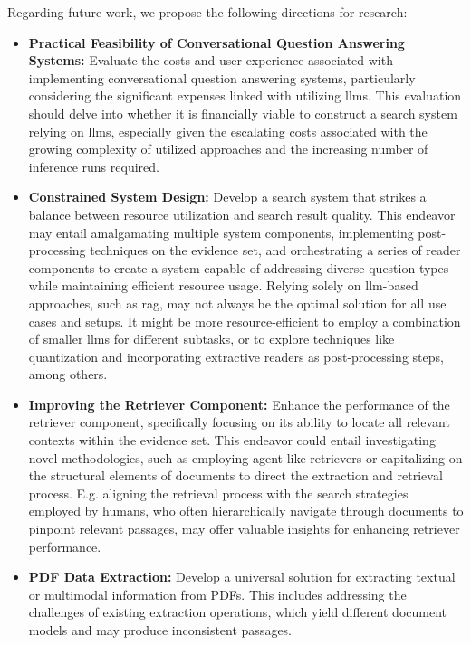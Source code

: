 \vspace{\baselineskip}
\noindent Regarding future work, we propose the following directions for research:
\begin{itemize}
    \item \textbf{Practical Feasibility of Conversational Question Answering Systems:} Evaluate the costs and user experience associated with implementing conversational question answering systems, particularly considering the significant expenses linked with utilizing \gls{llm}s. This evaluation should delve into whether it is financially viable to construct a search system relying on \gls{llm}s, especially given the escalating costs associated with the growing complexity of utilized approaches and the increasing number of inference runs required. 

    \item \textbf{Constrained System Design:} Develop a search system that strikes a balance between resource utilization and search result quality. This endeavor may entail amalgamating multiple system components, implementing post-processing techniques on the evidence set, and orchestrating a series of reader components to create a system capable of addressing diverse question types while maintaining efficient resource usage. Relying solely on \gls{llm}-based approaches, such as \gls{rag}, may not always be the optimal solution for all use cases and setups. It might be more resource-efficient to employ a combination of smaller \gls{llm}s for different subtasks, or to explore techniques like quantization and incorporating extractive readers as post-processing steps, among others.

    \item \textbf{Improving the Retriever Component:} Enhance the performance of the retriever component, specifically focusing on its ability to locate all relevant contexts within the evidence set. This endeavor could entail investigating novel methodologies, such as employing agent-like retrievers or capitalizing on the structural elements of documents to direct the extraction and retrieval process. E.g. aligning the retrieval process with the search strategies employed by humans, who often hierarchically navigate through documents to pinpoint relevant passages, may offer valuable insights for enhancing retriever performance.

    \item \textbf{PDF Data Extraction:} Develop a universal solution for extracting textual or multimodal information from PDFs. This includes addressing the challenges of existing extraction operations, which yield different document models and may produce inconsistent passages. 
\end{itemize}